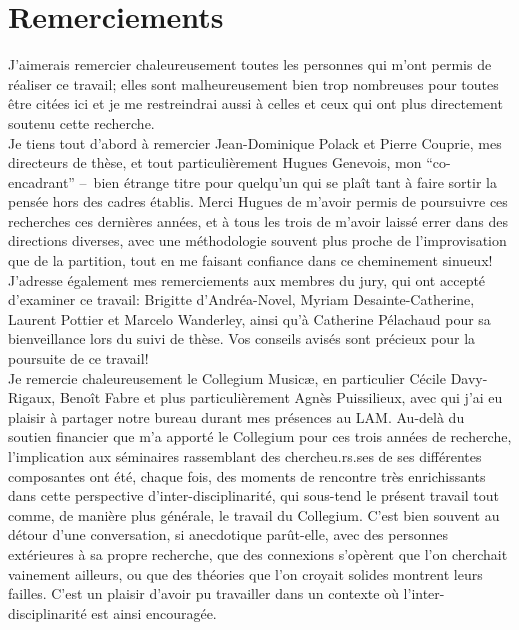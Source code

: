 %
\chapter*{Remerciements}
\label{sec:acknowledgement}
\vspace*{-10mm}


J'aimerais remercier chaleureusement toutes les personnes qui m'ont permis de réaliser ce travail; elles sont malheureusement bien trop nombreuses pour toutes être citées ici et je me restreindrai aussi à celles et ceux qui ont plus directement soutenu cette recherche.\\
\indent Je tiens tout d'abord à remercier Jean-Dominique Polack et Pierre Couprie, mes directeurs de thèse, et tout particulièrement Hugues Genevois, mon ``co-encadrant'' --~bien étrange titre pour quelqu'un qui se plaît tant à faire sortir la pensée hors des cadres établis. Merci Hugues de m'avoir permis de poursuivre ces recherches ces dernières années, et à tous les trois de m'avoir laissé errer dans des directions diverses, avec une méthodologie souvent plus proche de l'improvisation que de la partition, tout en me faisant confiance dans ce cheminement sinueux!\\
\indent J'adresse également mes remerciements aux membres du jury, qui ont accepté d'examiner ce travail: Brigitte d'Andréa-Novel, Myriam Desainte-Catherine, Laurent Pottier et Marcelo Wanderley, ainsi qu'à Catherine Pélachaud pour sa bienveillance lors du suivi de thèse. Vos conseils avisés sont précieux pour la poursuite de ce travail!\\
\indent Je remercie chaleureusement le Collegium Musicæ, en particulier Cécile Davy-Rigaux, Benoît Fabre et plus particulièrement Agnès Puissilieux, avec qui j'ai eu plaisir à partager notre bureau durant mes présences au LAM. Au-delà du soutien financier que m'a apporté le Collegium pour ces trois années de recherche, l'implication aux séminaires rassemblant des chercheu.rs.ses de ses différentes composantes ont été, chaque fois, des moments de rencontre très enrichissants dans cette perspective d'inter-disciplinarité, qui sous-tend le présent travail tout comme, de manière plus générale, le travail du Collegium. C'est bien souvent au détour d'une conversation, si anecdotique parût-elle, avec des personnes extérieures à sa propre recherche, que des connexions s'opèrent que l'on cherchait vainement ailleurs, ou que des théories que l'on croyait solides montrent leurs failles. C'est un plaisir d'avoir pu travailler dans un contexte où l'inter-disciplinarité est ainsi encouragée.\\
